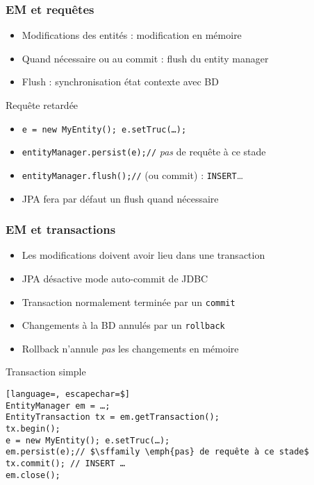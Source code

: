 \documentclass[english, french]{beamer}
\begin{document}
\begin{frame}
	\frametitle{EM et requêtes}
	\begin{itemize}
		\item Modifications des entités : modification en mémoire
		\item Quand nécessaire ou au commit : flush du entity manager
		\item Flush : synchronisation état contexte avec BD
	\end{itemize}
	\begin{exampleblock}{Requête retardée}
		\begin{itemize}
			\item \texttt{e = new MyEntity(); e.setTruc(…);}
			\item \texttt{entityManager.persist(e);//} \emph{pas} de requête à ce stade
			\item \texttt{entityManager.flush();//} (ou commit) : \texttt{INSERT}…
		\end{itemize}
	\end{exampleblock}
	\begin{itemize}
		\item JPA fera {\tiny par défaut} un flush quand nécessaire
	\end{itemize}
\end{frame}

\begin{frame}[fragile]
	\frametitle{EM et transactions}
	\begin{itemize}
		\item Les modifications doivent avoir lieu dans une transaction
		\item JPA désactive mode auto-commit de JDBC
		\item Transaction {\tiny normalement} terminée par un \texttt{commit}
		\item Changements à la BD annulés par un \texttt{rollback}
		\item Rollback n’annule \emph{pas} les changements en mémoire
	\end{itemize}
	\begin{exampleblock}{Transaction simple}
		\begin{lstlisting}[language=, escapechar=$]
EntityManager em = …;
EntityTransaction tx = em.getTransaction();
tx.begin();
e = new MyEntity(); e.setTruc(…);
em.persist(e);// $\sffamily \emph{pas} de requête à ce stade$
tx.commit(); // INSERT …
em.close();
		\end{lstlisting}
	\end{exampleblock}
\end{frame}
\end{document}
